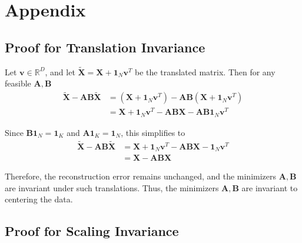 \documentclass[oneside]{article}
\begin{document}
\printbibliography[heading=none]

\clearpage
\section{Appendix}

\subsection{Proof for Translation Invariance}
\label{subsec:translation_invariance}

Let $\mathbf{v} \in \mathbb{R}^{D}$, and let $\tilde{\mathbf{X}} = \mathbf{X} + \mathbf{1}_N \mathbf{v}^T$ be the translated matrix. Then for any feasible $\mathbf{A}, \mathbf{B}$
\begin{equation}
    \begin{aligned}
    \tilde{\mathbf{X}} - \mathbf{A} \mathbf{B} \tilde{\mathbf{X}}
    &= \left(\mathbf{X} + \mathbf{1}_N \mathbf{v}^T \right) - \mathbf{A} \mathbf{B} \left(\mathbf{X} + \mathbf{1}_N \mathbf{v}^T \right) \\
    &= \mathbf{X} + \mathbf{1}_N \mathbf{v}^T - \mathbf{A} \mathbf{B} \mathbf{X} -  \mathbf{A} \mathbf{B} \mathbf{1}_N \mathbf{v}^T
    \end{aligned}
\end{equation}

Since $\mathbf{B} \mathbf{1}_N = \mathbf{1}_K$ and  $\mathbf{A} \mathbf{1}_K = \mathbf{1}_N$, this simplifies to
\begin{equation}
    \begin{aligned}
    \tilde{\mathbf{X}} - \mathbf{A} \mathbf{B} \tilde{\mathbf{X}}
    &= \mathbf{X} + \mathbf{1}_N \mathbf{v}^T - \mathbf{A} \mathbf{B} \mathbf{X} - \mathbf{1}_N \mathbf{v}^T \\
    &= \mathbf{X} - \mathbf{A} \mathbf{B} \mathbf{X}
    \end{aligned}
\end{equation}

Therefore, the reconstruction error remains unchanged, and the minimizers $\mathbf{A}, \mathbf{B}$ are invariant under such translations. Thus, the minimizers $\mathbf{A}, \mathbf{B}$ are invariant to centering the data.

\subsection{Proof for Scaling Invariance}
\label{subsec:scaling_invariance}
\end{document}
